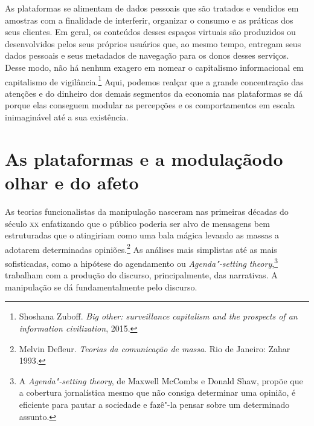 As plataformas se alimentam de dados pessoais que são tratados e
vendidos em amostras com a finalidade de interferir, organizar o consumo
e as práticas dos seus clientes. Em geral, os conteúdos desses espaços
virtuais são produzidos ou desenvolvidos pelos seus próprios usuários
que, ao mesmo tempo, entregam seus dados pessoais e seus metadados de
navegação para os donos desses serviços. Desse modo, não há nenhum
exagero em nomear o capitalismo informacional em capitalismo de
vigilância.\footnote{Shoshana Zuboff. \textit{Big other: surveillance capitalism and the
prospects of an information civilization}, 2015.} Aqui, podemos realçar que a grande
concentração das atenções e do dinheiro dos demais segmentos da economia
nas plataformas se dá porque elas conseguem modular as percepções e os
comportamentos em escala inimaginável até a sua existência.

\section{As plataformas e a modulação\break do olhar e do afeto}

As teorias funcionalistas da manipulação nasceram nas primeiras décadas
do século \textsc{xx} enfatizando que o público poderia ser alvo de mensagens bem
estruturadas que o atingiriam como uma bala mágica levando as massas a
adotarem determinadas opiniões.\footnote{Melvin Defleur. \textit{Teorias da comunicação de massa}. Rio de Janeiro: Zahar 1993.} As análises mais
simplistas até as mais sofisticadas, como a hipótese do agendamento ou
\textit{Agenda"-setting theory},\footnote{A \textit{Agenda"-setting theory}, de
  Maxwell McCombs e Donald Shaw, propõe que a cobertura jornalística
  mesmo que não consiga determinar uma opinião, é eficiente para pautar a
  sociedade e fazê"-la pensar sobre um determinado assunto.} trabalham com a produção do discurso, principalmente, das narrativas. A manipulação se dá
fundamentalmente pelo discurso.


